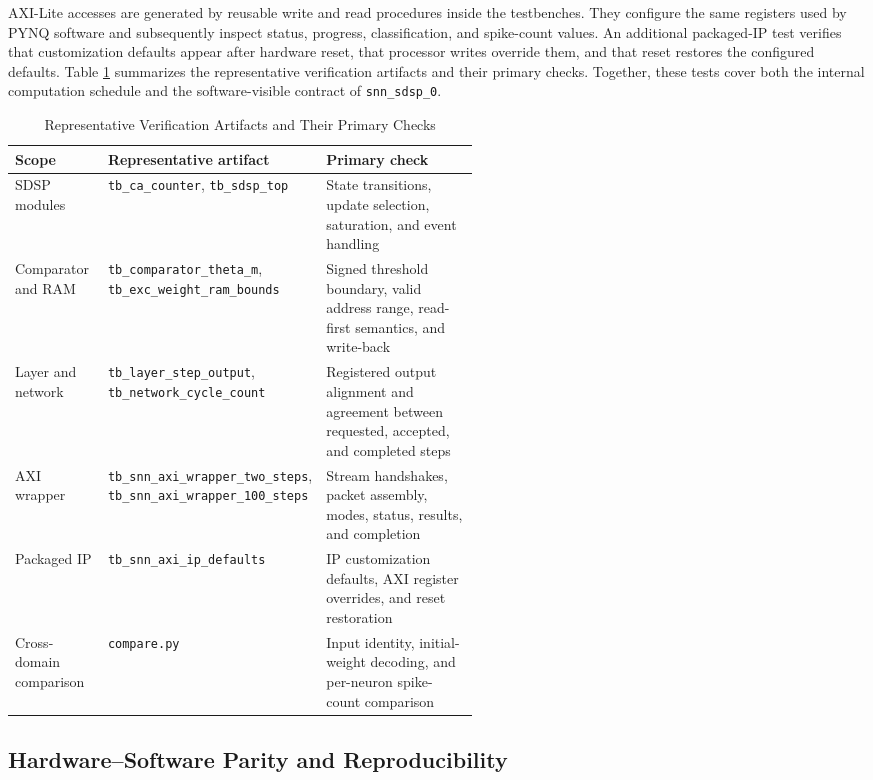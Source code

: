 AXI-Lite accesses are generated by reusable write and read procedures inside the testbenches. They configure the same registers used by PYNQ software and subsequently inspect status, progress, classification, and spike-count values. An additional packaged-IP test verifies that customization defaults appear after hardware reset, that processor writes override them, and that reset restores the configured defaults. Table \ref{tab:verification-artifacts} summarizes the representative verification artifacts and their primary checks. Together, these tests cover both the internal computation schedule and the software-visible contract of \texttt{snn\_sdsp\_0}.

\begin{table}[htbp]
	\centering
	\caption{Representative Verification Artifacts and Their Primary Checks}
	\label{tab:verification-artifacts}
	\small
	\begin{tabularx}{\linewidth}{@{}p{0.20\linewidth}p{0.34\linewidth}X@{}}
		\toprule
		\textbf{Scope} & \textbf{Representative artifact} & \textbf{Primary check} \\
		\midrule
		SDSP modules & \texttt{tb\_ca\_counter}, \texttt{tb\_sdsp\_top} & State transitions, update selection, saturation, and event handling \\
		Comparator and RAM & \texttt{tb\_comparator\_theta\_m}, \texttt{tb\_exc\_weight\_ram\_bounds} & Signed threshold boundary, valid address range, read-first semantics, and write-back \\
		Layer and network & \texttt{tb\_layer\_step\_output}, \texttt{tb\_network\_cycle\_count} & Registered output alignment and agreement between requested, accepted, and completed steps \\
		AXI wrapper & \texttt{tb\_snn\_axi\_wrapper\_two\_steps}, \texttt{tb\_snn\_axi\_wrapper\_100\_steps} & Stream handshakes, packet assembly, modes, status, results, and completion \\
		Packaged IP & \texttt{tb\_snn\_axi\_ip\_defaults} & IP customization defaults, AXI register overrides, and reset restoration \\
		Cross-domain comparison & \texttt{compare.py} & Input identity, initial-weight decoding, and per-neuron spike-count comparison \\
		\bottomrule
	\end{tabularx}
\end{table}

\subsection{Hardware--Software Parity and Reproducibility}

